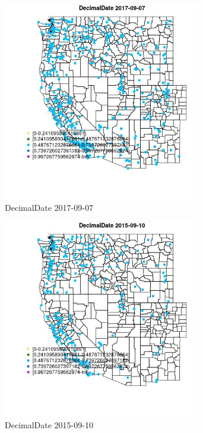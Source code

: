 \begin{figure} 
\centering  
\includegraphics[width=0.77\textwidth]{Code_Outputs/Report_ML_input_PM25_Step4_part_e_de_duplicated_aveswNAs_MapObsDecimalDate2017-09-07.jpg} 
\caption{\label{fig:Report_ML_input_PM25_Step4_part_e_de_duplicated_aveswNAsMapObsDecimalDate2017-09-07}DecimalDate 2017-09-07} 
\end{figure} 
 

\begin{figure} 
\centering  
\includegraphics[width=0.77\textwidth]{Code_Outputs/Report_ML_input_PM25_Step4_part_e_de_duplicated_aveswNAs_MapObsDecimalDate2015-09-10.jpg} 
\caption{\label{fig:Report_ML_input_PM25_Step4_part_e_de_duplicated_aveswNAsMapObsDecimalDate2015-09-10}DecimalDate 2015-09-10} 
\end{figure} 
 

